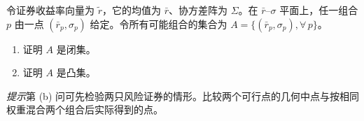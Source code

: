 \par\noindent\begin{minipage}{\linewidth}
\begin{problem}
 令证券收益率向量为 $\tilde{r}$，它的均值为 $\bar{r}$、协方差阵为 $\Sigma$。在 $\bar{r}$--$\sigma$ 平面上，任一组合 $p$ 由一点 $(\bar{r}_{p},\sigma_{p})$ 给定。令所有可能组合的集合为 $A=\{(\bar{r}_{p},\sigma_{p}),\forall\, p\}$。
\begin{enumerate}[label=(\alph*)]
    \item 证明 $A$ 是闭集。
    \item 证明 $A$ 是凸集。
\end{enumerate}
\par\textit{提示}\quad 第 (b) 问可先检验两只风险证券的情形。比较两个可行点的几何中点与按相同权重混合两个组合后实际得到的点。
\end{problem}
\end{minipage}\par
{}
